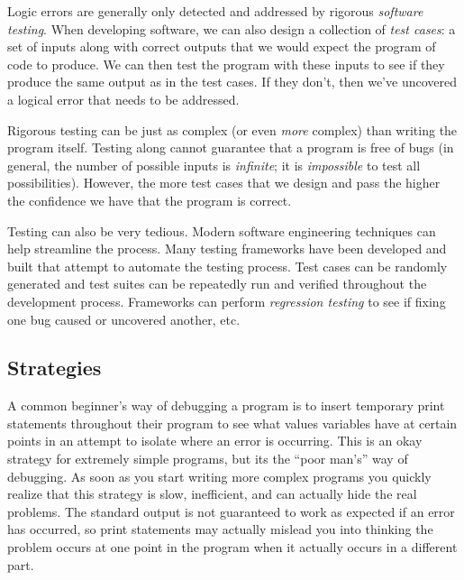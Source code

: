 Logic errors are generally only detected and addressed by rigorous 
 \emph{software testing}.  When developing 
software, we can also
design a collection of  \emph{test cases}: a set 
of inputs along with
correct outputs that we would expect the program of code to produce.
We can then test the program with these inputs to see if they produce
the same output as in the test cases.  If they don't, then we've uncovered
a logical error that needs to be addressed.

Rigorous testing can be just as complex (or even \emph{more} complex) 
than writing the program itself.  Testing along cannot guarantee that a
program is free of bugs (in general, the number of possible inputs is
\emph{infinite}; it is \emph{impossible} to test all possibilities).  However, 
the more test cases that we design and pass the higher the confidence 
we have that the program is correct.

Testing can also be very tedious.  Modern software engineering techniques
can help streamline the process.  Many testing frameworks have been
developed and built that attempt to automate the testing process.  Test 
cases can be randomly generated and test suites can be repeatedly 
run and verified throughout the development process.  Frameworks
can perform  \emph{regression testing} to see if fixing one bug caused or uncovered another, etc.

\subsection{Strategies}

A common beginner's way of debugging a program is to insert 
temporary print statements throughout their program to see what
values variables have at certain points in an attempt to isolate where
an error is occurring.  This is an okay strategy for extremely simple
programs, but its the ``poor man's'' way of debugging.  As soon as
you start writing more complex programs you quickly realize that this
strategy is slow, inefficient, and can actually hide the real problems. 
The standard output is not guaranteed to work as expected if an error
has occurred, so print statements may actually mislead you into thinking
the problem occurs at one point in the program when it actually
occurs in a different part.

